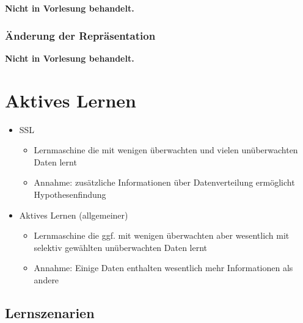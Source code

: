 \documentclass[paper=a4, fontsize=11pt]{scrartcl} %
\numberwithin{equation}{section} %
\numberwithin{figure}{section} %
\numberwithin{table}{section} %
\begin{document}
\textbf{Nicht in Vorlesung behandelt.}

\subsubsection{Änderung der Repräsentation}

\textbf{Nicht in Vorlesung behandelt.}

\section{Aktives Lernen}

\begin{itemize}
\item SSL
\begin{itemize}
\item Lernmaschine die mit wenigen überwachten und vielen unüberwachten Daten lernt
\item Annahme: zusätzliche Informationen über Datenverteilung ermöglicht Hypothesenfindung
\end{itemize}
\item Aktives Lernen (allgemeiner)
\begin{itemize}
\item Lernmaschine die ggf. mit wenigen überwachten aber wesentlich mit selektiv gewählten unüberwachten Daten lernt
\item Annahme: Einige Daten enthalten wesentlich mehr Informationen als andere
\end{itemize}
\end{itemize}

\subsection{Lernszenarien}
\end{document}
